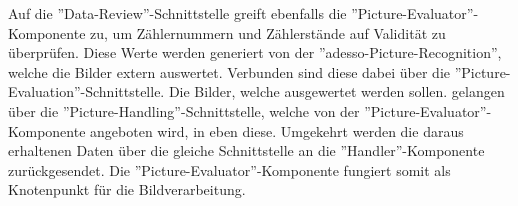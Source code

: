 Auf die ''Data-Review''-Schnittstelle greift ebenfalls die ''Picture-Evaluator''-Komponente zu, um Zählernummern und Zählerstände auf Validität zu überprüfen. Diese Werte werden generiert von der ''adesso-Picture-Recognition'', welche die Bilder extern auswertet. Verbunden sind diese dabei über die ''Picture-Evaluation''-Schnittstelle. Die Bilder, welche ausgewertet werden sollen. gelangen über die ''Picture-Handling''-Schnittstelle, welche von der ''Picture-Evaluator''-Komponente angeboten wird, in eben diese. Umgekehrt werden die daraus erhaltenen Daten über die gleiche Schnittstelle an die ''Handler''-Komponente zurückgesendet. Die ''Picture-Evaluator''-Komponente fungiert somit als Knotenpunkt für die Bildverarbeitung. 

